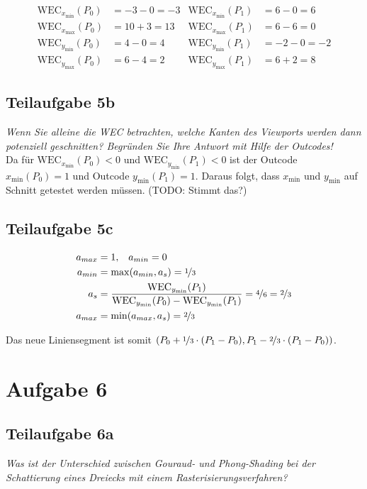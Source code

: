 \documentclass[a4paper]{scrartcl}
\begin{document}
\begin{align}
    \text{WEC}_{x_\text{min}}(P_0) &= -3-0 =-3 & \text{WEC}_{x_\text{min}}(P_1) &= 6-0 =6\\
    \text{WEC}_{x_\text{max}}(P_0) &= 10+3 =13 & \text{WEC}_{x_\text{max}}(P_1) &= 6-6 =0\\
    \text{WEC}_{y_\text{min}}(P_0) &= 4-0 = 4 & \text{WEC}_{y_\text{min}}(P_1) &= -2-0 =-2\\
    \text{WEC}_{y_\text{max}}(P_0) &= 6-4 = 2 & \text{WEC}_{y_\text{max}}(P_1) &= 6+2 =8
\end{align}

\goodbreak
\subsection*{Teilaufgabe 5b}
\textit{Wenn Sie alleine die WEC betrachten, welche Kanten des Viewports werden dann potenziell geschnitten? Begründen Sie Ihre Antwort mit Hilfe der Outcodes!}\\
Da für $\text{WEC}_{x_\text{min}}(P_0) < 0$ und $\text{WEC}_{y_\text{min}}(P_1) < 0$
ist der Outcode $x_\text{min}(P_0) = 1$ und Outcode $y_\text{min}(P_1) = 1$.
Daraus folgt, dass $x_\text{min}$ und $y_\text{min}$ auf Schnitt getestet
werden müssen. (TODO: Stimmt das?)

\subsection*{Teilaufgabe 5c}
\begin{align}
    a_{max} &= 1,\;\;\; a_{min} = 0\\
    a_{min} &= \max(a_{min}, a_s) = \nicefrac{1}{3}\\
    a_s &= \frac{\text{WEC}_{y_\text{min}}(P_1)}{\text{WEC}_{y_\text{min}}(P_0) - \text{WEC}_{y_\text{min}}(P_1)} = \nicefrac{4}{6} = \nicefrac{2}{3}\\
    a_{max} &= \min(a_{max}, a_s) = \nicefrac{2}{3}\\
\end{align}

Das neue Liniensegment ist somit $(P_0 + \nicefrac{1}{3} \cdot (P_1- P_0), P_1 - \nicefrac{2}{3} \cdot (P_1- P_0))$.

\section*{Aufgabe 6}
\subsection*{Teilaufgabe 6a}
\textit{Was ist der Unterschied zwischen Gouraud- und Phong-Shading bei der Schattierung eines Dreiecks mit einem Rasterisierungsverfahren?}
\end{document}
